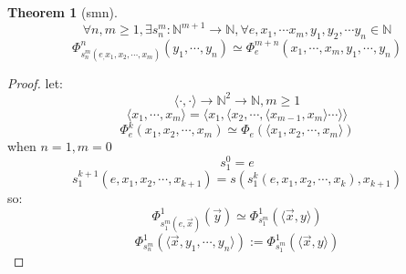 \documentclass[10pt,a4paper]{article}
\newtheorem{theorem}{Theorem}[section]
\begin{document}
\begin{theorem}[smn]
    \[\forall n,m\ge 1,\exists s_n^m:\mathbb{N}^{m+1}\to\mathbb{N},\forall e,x_1,\cdots x_m,y_1,y_2,\cdots y_n\in\mathbb{N}\]
    \[\Phi_{{s_n^m}(e_,x_1,x_2,\cdots,x_m)}^n(y_1,\cdots,y_n)\simeq\Phi_{e}^{m+n}(x_1,\cdots,x_m,y_1,\cdots,y_n)\]
\end{theorem}
\begin{proof}
    let:
    \[\langle\cdot,\cdot\rangle\to\mathbb{N}^2\to\mathbb{N},m\ge 1\]
    \[\langle x_1,\cdots,x_m\rangle=\langle x_1,\langle x_2,\cdots,\langle x_{m-1},x_m\rangle\cdots\rangle\rangle\]
    \[\Phi_e^k(x_1,x_2,\cdots,x_m)\simeq\Phi_e(\langle x_1,x_2,\cdots,x_m\rangle)\]
    when $n=1,m=0$
    \[s_1^0=e\]
    \[s_1^{k+1}(e,x_1,x_2,\cdots,x_{k+1})=s(s_1^k(e,x_1,x_2,\cdots,x_k),x_{k+1})\]
    so:\[\Phi_{s_1^m(e,\vec{x})}^1(\vec{y})\simeq\Phi_{s_1^m}^1(\langle\vec{x},y\rangle)\]
    \[\Phi_{s_n^m}^1(\langle\vec{x},y_1,\cdots,y_n\rangle):=\Phi_{s_1^m}^1(\langle\vec{x},y\rangle)\]
\end{proof}
\end{document}
